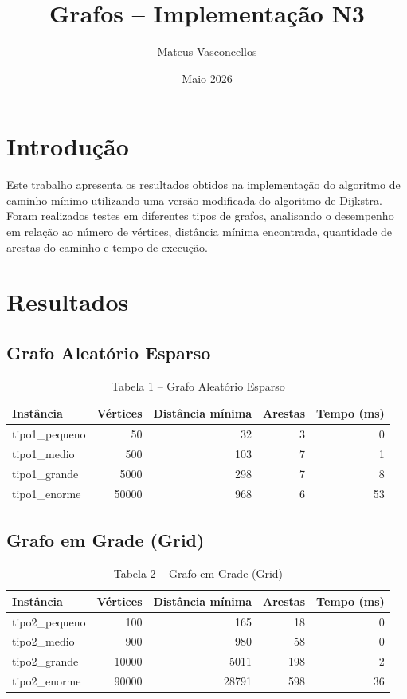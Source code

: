 \documentclass[a4paper,12pt]{article}
\title{Grafos -- Implementação N3}
\author{Mateus Vasconcellos}
\date{Maio 2026}
\begin{document}
\maketitle

\section{Introdução}

Este trabalho apresenta os resultados obtidos na implementação do algoritmo de caminho mínimo utilizando uma versão modificada do algoritmo de Dijkstra. Foram realizados testes em diferentes tipos de grafos, analisando o desempenho em relação ao número de vértices, distância mínima encontrada, quantidade de arestas do caminho e tempo de execução.


\section{Resultados}

\subsection{Grafo Aleatório Esparso}

\begin{table}[H]
\centering
\caption{Tabela 1 -- Grafo Aleatório Esparso}
\begin{tabular}{lrrrr}
\toprule
Instância & Vértices & Distância mínima & Arestas & Tempo (ms) \\
\midrule
tipo1\_pequeno & 50 & 32 & 3 & 0 \\
tipo1\_medio & 500 & 103 & 7 & 1 \\
tipo1\_grande & 5000 & 298 & 7 & 8 \\
tipo1\_enorme & 50000 & 968 & 6 & 53 \\
\bottomrule
\end{tabular}
\end{table}

\subsection{Grafo em Grade (Grid)}

\begin{table}[H]
\centering
\caption{Tabela 2 -- Grafo em Grade (Grid)}
\begin{tabular}{lrrrr}
\toprule
Instância & Vértices & Distância mínima & Arestas & Tempo (ms) \\
\midrule
tipo2\_pequeno & 100 & 165 & 18 & 0 \\
tipo2\_medio & 900 & 980 & 58 & 0 \\
tipo2\_grande & 10000 & 5011 & 198 & 2 \\
tipo2\_enorme & 90000 & 28791 & 598 & 36 \\
\bottomrule
\end{tabular}
\end{table}
\end{document}
